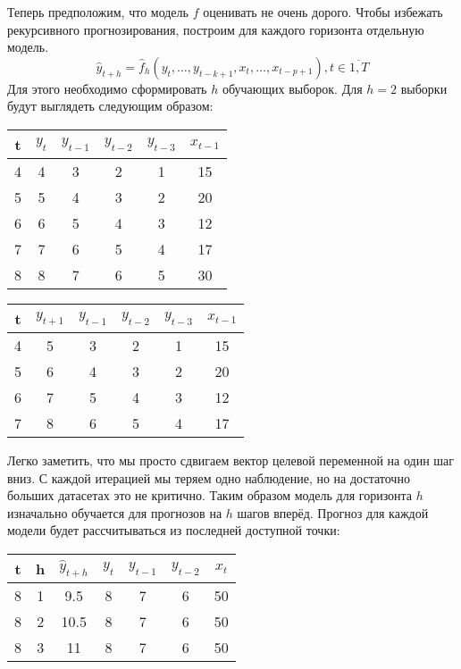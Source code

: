\documentclass[12pt,fleqn]{article}
\begin{document}
Теперь предположим, что модель $f$ оценивать не очень дорого. Чтобы избежать рекурсивного прогнозирования, построим для каждого горизонта отдельную модель. 
$$
\hat{y}_{t+h} = \hat{f}_h(y_t, \ldots, y_{t-k+1}, x_{t}, \ldots, x_{t-p+1}), t \in \overline{1, T}
$$
Для этого необходимо сформировать $h$ обучающих выборок. Для $h=2$ выборки будут выглядеть следующим образом:

\begin{table}[!h]
	 	\centering
	\begin{tabular}[t]{|c|c|cccc|}
		\hline
		t & $y_t$ & $y_{t-1}$ & $y_{t-2}$ & $y_{t-3}$ & $x_{t-1}$ \\ \hline
		4 & 4              & 3                  & 2         & 1         & 15        \\
		5 & 5              & 4                  & 3         & 2         & 20        \\
		6 & 6              & 5                  & 4         & 3         & 12        \\
		7 & 7              & 6                  & 5         & 4         & 17        \\
		8 & 8              & 7                  & 6         & 5         & 30        \\ \hline
	\end{tabular}
	\quad
		\begin{tabular}[t]{|c|c|cccc|}
			\hline
			t & $y_{t+1}$      & $y_{t-1}$ & $y_{t-2}$ & $y_{t-3}$ & $x_{t-1}$ \\ \hline
			4 & 5                & 3                  & 2         & 1         & 15        \\
			5 & 6                & 4                  & 3         & 2         & 20        \\
			6 & 7                & 5                  & 4         & 3         & 12        \\
			7 & 8                & 6                  & 5         & 4         & 17        \\ \hline
		\end{tabular}
\end{table}

Легко заметить, что мы просто сдвигаем вектор целевой переменной на один шаг вниз. С каждой итерацией мы теряем одно наблюдение, но на достаточно больших датасетах это не критично. Таким образом модель для горизонта $h$ изначально обучается для прогнозов на $h$ шагов вперёд. Прогноз для каждой модели будет рассчитываться из последней доступной точки:

\begin{table}[!h]
	\centering
	\begin{tabular}{|cc|ccccc|}
		\hline
		t & h & $\hat{y}_{t+h}$ & $y_t$ & $y_{t-1}$ & $y_{t-2}$ & $x_{t}$ \\ \hline
		8 & 1 & 9.5             & 8     & 7         & 6         & 50      \\
		8 & 2 & 10.5            & 8     & 7         & 6         & 50      \\
		8 & 3 & 11              & 8     & 7         & 6         & 50      \\ \hline
	\end{tabular}
\end{table}
\end{document}
